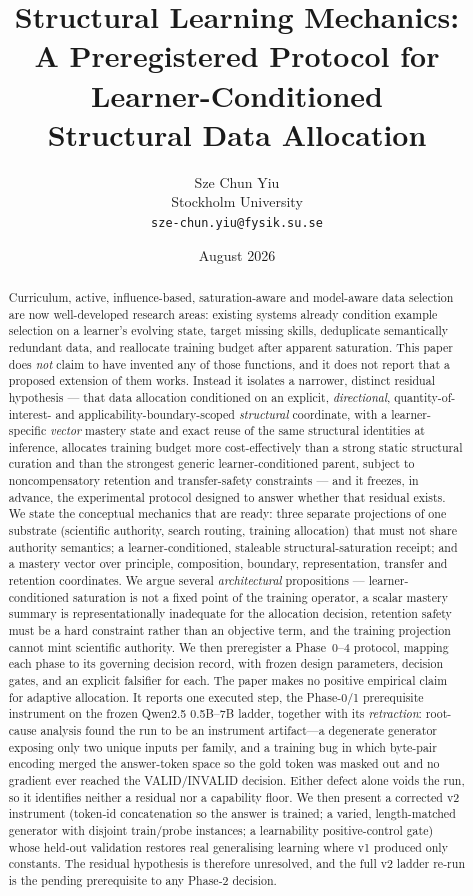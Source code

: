 \documentclass[11pt]{article}
\title{Structural Learning Mechanics:\\
A Preregistered Protocol for Learner-Conditioned\\
Structural Data Allocation}
\author{Sze Chun Yiu\\Stockholm University\\\texttt{sze-chun.yiu@fysik.su.se}}
\date{August 2026}
\begin{document}
\sloppy
\maketitle

\begin{abstract}
Curriculum, active, influence-based, saturation-aware and model-aware data selection are now well-developed research areas: existing systems already condition example selection on a learner's evolving state, target missing skills, deduplicate semantically redundant data, and reallocate training budget after apparent saturation. This paper does \emph{not} claim to have invented any of those functions, and it does not report that a proposed extension of them works. Instead it isolates a narrower, distinct residual hypothesis --- that data allocation conditioned on an explicit, \emph{directional}, quantity-of-interest- and applicability-boundary-scoped \emph{structural} coordinate, with a learner-specific \emph{vector} mastery state and exact reuse of the same structural identities at inference, allocates training budget more cost-effectively than a strong static structural curation and than the strongest generic learner-conditioned parent, subject to noncompensatory retention and transfer-safety constraints --- and it freezes, in advance, the experimental protocol designed to answer whether that residual exists. We state the conceptual mechanics that are ready: three separate projections of one substrate (scientific authority, search routing, training allocation) that must not share authority semantics; a learner-conditioned, staleable structural-saturation receipt; and a mastery vector over principle, composition, boundary, representation, transfer and retention coordinates. We argue several \emph{architectural} propositions --- learner-conditioned saturation is not a fixed point of the training operator, a scalar mastery summary is representationally inadequate for the allocation decision, retention safety must be a hard constraint rather than an objective term, and the training projection cannot mint scientific authority. We then preregister a Phase~0--4 protocol, mapping each phase to its governing decision record, with frozen design parameters, decision gates, and an explicit falsifier for each. The paper makes no positive empirical claim for adaptive allocation. It reports one executed step, the Phase-0/1 prerequisite instrument on the frozen Qwen2.5 0.5B--7B ladder, together with its \emph{retraction}: root-cause analysis found the run to be an instrument artifact---a degenerate generator exposing only two unique inputs per family, and a training bug in which byte-pair encoding merged the answer-token space so the gold token was masked out and no gradient ever reached the VALID/INVALID decision. Either defect alone voids the run, so it identifies neither a residual nor a capability floor. We then present a corrected v2 instrument (token-id concatenation so the answer is trained; a varied, length-matched generator with disjoint train/probe instances; a learnability positive-control gate) whose held-out validation restores real generalising learning where v1 produced only constants. The residual hypothesis is therefore unresolved, and the full v2 ladder re-run is the pending prerequisite to any Phase-2 decision.

\end{abstract}
\end{document}

